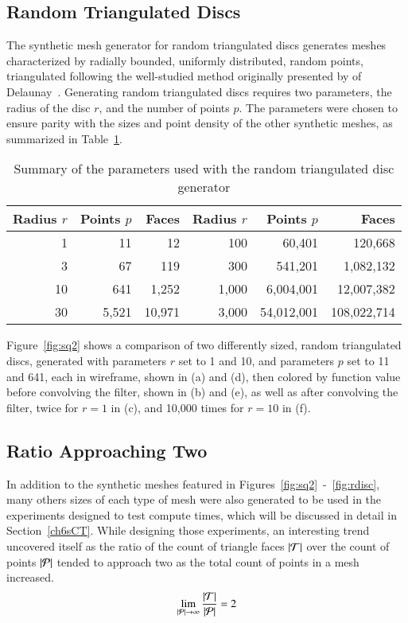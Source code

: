 \subsection{Random Triangulated Discs}
The synthetic mesh generator for random triangulated discs generates meshes characterized by radially bounded, uniformly distributed, random points,  triangulated following the well-studied method originally presented by of Delaunay~\cite{Delaunay34}. Generating random triangulated discs requires two parameters, the radius of the disc $r$, and the number of points $p$. The parameters were chosen to ensure parity with the sizes and point density of the other synthetic meshes, as summarized in Table~\ref{tbl:rdisc}.
\vspace*{-.5\baselineskip}
\begin{table}[ht]
\begin{tabular}{rrr|rrr}
\textbf{Radius $r$} & \textbf{Points $p$} & \textbf{Faces} & \textbf{Radius $r$} & \textbf{Points $p$} & \textbf{Faces}\\
\hline
    1 &         11 &          12 &   100 &     60,401 &     120,668\\
    3 &         67 &         119 &   300 &    541,201 &   1,082,132\\
   10 &        641 &       1,252 & 1,000 &  6,004,001 &  12,007,382\\
   30 &      5,521 &      10,971 & 3,000 & 54,012,001 & 108,022,714%
\caption{Summary of the parameters used with the random triangulated disc generator\label{tbl:rdisc}}
\end{tabular}
\end{table}

Figure~\ref{fig:sq2} shows a comparison of two differently sized, random triangulated discs, generated with parameters $r$ set to 1 and 10, and parameters $p$ set to 11 and 641, each in wireframe, shown in (a) and (d), then colored by function value before convolving the filter, shown in (b) and (e), as well as after convolving the filter, twice for $r=1$ in (c), and 10,000 times for $r=10$ in (f).
\vspace*{-\baselineskip}
%

%
%
%
%
\pagebreak
\subsection{Ratio Approaching Two}
In addition to the synthetic meshes featured in Figures~\ref{fig:sq2}~-~\ref{fig:rdisc}, many others sizes of each type of mesh were also generated to be used in the experiments designed to test compute times, which will be discussed in detail in Section~\ref{ch6sCT}. While designing those experiments, an interesting trend uncovered itself as the ratio of the count of triangle faces $|\mathcal{T}|$ over the count of points $|\mathcal{P}|$ tended to approach two as the total count of points in a mesh increased.
\begin{equation}
	\lim_{|\mathcal{P}| \rightarrow \infty}{\frac{|\mathcal{T}|}{|\mathcal{P}|}} = 2
	\label{eq:ratioApproachesTwo}
\end{equation}

